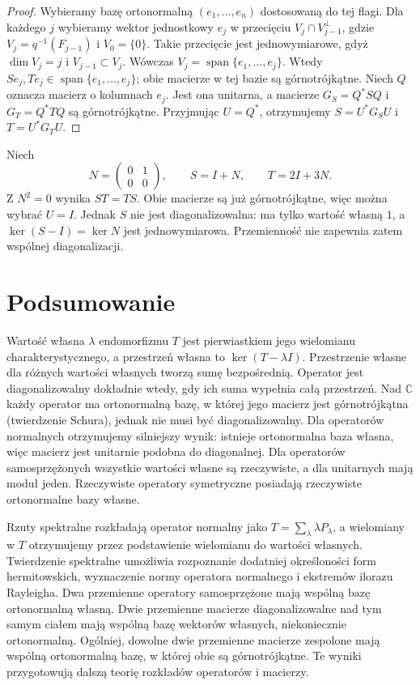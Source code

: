 \begin{proof}
Wybieramy bazę ortonormalną
\((e_1,\ldots,e_n)\) dostosowaną do tej flagi.
Dla każdego \(j\) wybieramy wektor jednostkowy
\(e_j\) w przecięciu \(V_j\cap V_{j-1}^{\perp}\),
gdzie \(V_j=q^{-1}(F_{j-1})\) i \(V_0=\{0\}\).
Takie przecięcie jest jednowymiarowe, gdyż
\(\dim V_j=j\) i \(V_{j-1}\subset V_j\).
Wówczas \(V_j=\operatorname{span}\{e_1,\ldots,e_j\}\).
Wtedy \(Se_j,Te_j\in
\operatorname{span}\{e_1,\ldots,e_j\}\);
obie macierze w tej bazie są górnotrójkątne.
Niech \(Q\) oznacza macierz o kolumnach \(e_j\).
Jest ona unitarna, a macierze
\(G_S=Q^*SQ\) i \(G_T=Q^*TQ\)
są górnotrójkątne.
Przyjmując \(U=Q^*\), otrzymujemy
\(S=U^*G_SU\) i \(T=U^*G_TU\).
\end{proof}

\begin{przyklad}
\label{prz:lin14-simultaneous-schur-defective}
Niech
\[
 N=\begin{pmatrix}0&1\\0&0\end{pmatrix},
 \qquad S=I+N,\qquad T=2I+3N.
\]
Z \(N^2=0\) wynika \(ST=TS\).
Obie macierze są już górnotrójkątne,
więc można wybrać \(U=I\).
Jednak \(S\) nie jest diagonalizowalna:
ma tylko wartość własną \(1\),
a \(\ker(S-I)=\ker N\)
jest jednowymiarowa.
Przemienność nie zapewnia zatem
wspólnej diagonalizacji.
\end{przyklad}

\section{Podsumowanie}
\label{sec:lin14-podsumowanie}

Wartość własna \(\lambda\)
endomorfizmu \(T\) jest pierwiastkiem
jego wielomianu charakterystycznego,
a przestrzeń własna to
\(\ker(T-\lambda I)\).
Przestrzenie własne dla różnych
wartości własnych tworzą sumę
bezpośrednią. Operator jest
diagonalizowalny dokładnie wtedy,
gdy ich suma wypełnia całą przestrzeń.
Nad \(\mathbb C\) każdy operator
ma ortonormalną bazę, w której
jego macierz jest górnotrójkątna
(twierdzenie Schura), jednak nie
musi być diagonalizowalny.
Dla operatorów normalnych
otrzymujemy silniejszy wynik:
istnieje ortonormalna baza
własna, więc macierz jest
unitarnie podobna do diagonalnej.
Dla operatorów samosprzężonych
wszystkie wartości własne są rzeczywiste,
a dla unitarnych mają moduł jeden.
Rzeczywiste operatory symetryczne
posiadają rzeczywiste ortonormalne
bazy własne.

Rzuty spektralne rozkładają
operator normalny jako
\(T=\sum_\lambda\lambda P_\lambda\),
a wielomiany w \(T\) otrzymujemy
przez podstawienie wielomianu
do wartości własnych.
Twierdzenie spektralne
umożliwia rozpoznanie dodatniej
określoności form hermitowskich,
wyznaczenie normy operatora
normalnego i ekstremów
ilorazu Rayleigha.
Dwa przemienne operatory
samosprzężone mają wspólną
bazę ortonormalną własną.
Dwie przemienne macierze diagonalizowalne
nad tym samym ciałem mają wspólną
bazę wektorów własnych, niekoniecznie ortonormalną.
Ogólniej, dowolne dwie przemienne
macierze zespolone mają wspólną
ortonormalną bazę, w której
obie są górnotrójkątne.
Te wyniki przygotowują
dalszą teorię rozkładów
operatorów i macierzy.

